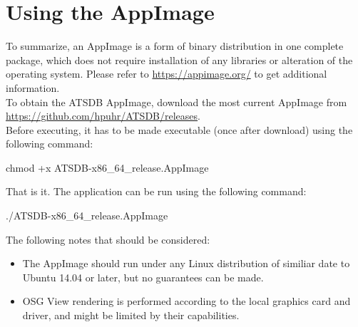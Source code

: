 \section{Using the AppImage}

To summarize, an AppImage is a form of binary distribution in one complete package, which does not require installation of any libraries or alteration of the operating system. Please refer to \url{https://appimage.org/} to get additional information. \\

To obtain the ATSDB AppImage, download the most current AppImage from \url{https://github.com/hpuhr/ATSDB/releases}. \\

Before executing, it has to be made executable (once after download) using the following command:
\begin{cverbatim}
chmod +x ATSDB-x86_64_release.AppImage
\end{cverbatim}

That is it. The application can be run using the following command:
\begin{cverbatim}
./ATSDB-x86_64_release.AppImage
\end{cverbatim}

The following notes that should be considered:

\begin{itemize}  
\item The AppImage should run under any Linux distribution of similiar date to Ubuntu 14.04 or later, but no guarantees can be made.
\item OSG View rendering is performed according to the local graphics card and driver, and might be limited by their capabilities.
\end{itemize} 
